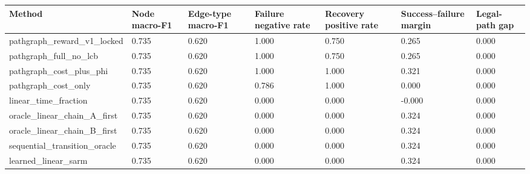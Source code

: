 \begin{tabular}{lllllll}
\toprule
Method & Node macro-F1 & Edge-type macro-F1 & Failure negative rate & Recovery positive rate & Success–failure margin & Legal-path gap \\
\midrule
pathgraph\_reward\_v1\_locked & 0.735 & 0.620 & 1.000 & 0.750 & 0.265 & 0.000 \\
pathgraph\_full\_no\_lcb & 0.735 & 0.620 & 1.000 & 0.750 & 0.265 & 0.000 \\
pathgraph\_cost\_plus\_phi & 0.735 & 0.620 & 1.000 & 1.000 & 0.321 & 0.000 \\
pathgraph\_cost\_only & 0.735 & 0.620 & 0.786 & 1.000 & 0.000 & 0.000 \\
linear\_time\_fraction & 0.735 & 0.620 & 0.000 & 0.000 & -0.000 & 0.000 \\
oracle\_linear\_chain\_A\_first & 0.735 & 0.620 & 0.000 & 0.000 & 0.324 & 0.000 \\
oracle\_linear\_chain\_B\_first & 0.735 & 0.620 & 0.000 & 0.000 & 0.324 & 0.000 \\
sequential\_transition\_oracle & 0.735 & 0.620 & 0.000 & 0.000 & 0.324 & 0.000 \\
learned\_linear\_sarm & 0.735 & 0.620 & 0.000 & 0.000 & 0.324 & 0.000 \\
\bottomrule
\end{tabular}


